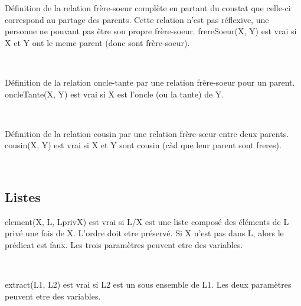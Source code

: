 \documentclass[a4paper, 11pt]{article}
\newenvironment{DDbox}[1]{
\begin{lrbox}{\BBbox}\begin{minipage}{\linewidth}}
{\end{minipage}\end{lrbox}\noindent\colorbox{Zgris}{\usebox{\BBbox}} \\
[.5cm]}
\begin{document}
Définition de la relation frère-soeur complète en partant du
constat que celle-ci correspond au partage des parents. Cette
relation n'est pas réflexive, une personne ne pouvant pas être
son propre frère-soeur. frereSoeur(X, Y) est vrai si X et Y ont
le meme parent (donc sont frère-soeur). \\
\begin{DDbox}{\linewidth}
    
\end{DDbox}

Définition de la relation oncle-tante par une relation
frère-soeur pour un parent. oncleTante(X, Y) est vrai si X est
l'oncle (ou la tante) de Y. \\
\begin{DDbox}{\linewidth}
    
\end{DDbox}

Définition de la relation cousin par une relation frère-sœur
entre deux parents.  cousin(X, Y) est vrai si X et Y sont cousin
(càd que leur parent sont freres). \\
\begin{DDbox}{\linewidth}
    
\end{DDbox}

%     

\subsection{Listes}
element(X, L, LprivX) est vrai si L/X est une liste composé des
éléments de L privé une fois de X. L'ordre doit etre préservé.  Si
X n'est pas dans L, alors le prédicat est faux.  Les trois
paramètres peuvent etre des variables. \\
\begin{DDbox}{\linewidth}
    
\end{DDbox}

extract(L1, L2) est vrai si L2 est un sous ensemble de L1. Les
deux paramètres peuvent etre des variables. \\
\begin{DDbox}{\linewidth}
    
\end{DDbox}
\end{document}

